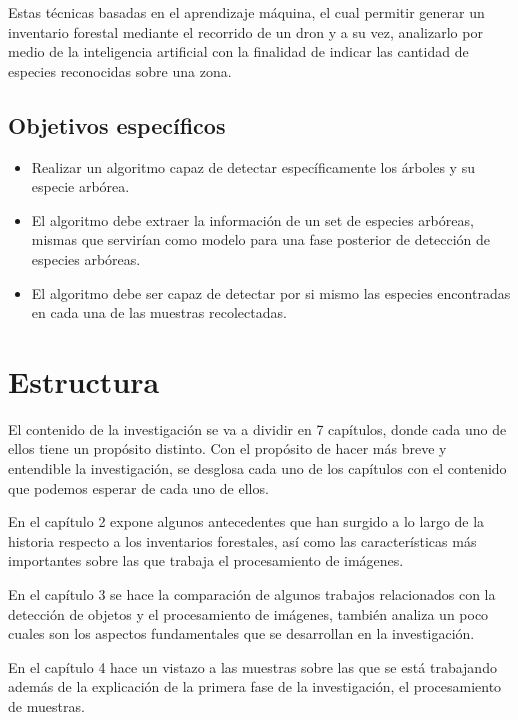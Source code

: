 Estas técnicas  basadas en el aprendizaje máquina, el cual permitir
generar un inventario forestal mediante el recorrido de un dron y a su vez, analizarlo por medio de la inteligencia artificial con la finalidad de indicar las cantidad de especies reconocidas sobre una zona.

\subsection{Objetivos específicos}
\begin{itemize}
\item Realizar un algoritmo capaz de detectar específicamente los árboles y su especie arbórea.
\end{itemize}

\begin{itemize}
\item El algoritmo debe extraer la información de un set de especies arbóreas, mismas que servirían como modelo para una fase posterior de detección de especies arbóreas.
\end{itemize}

\begin{itemize}
\item El algoritmo debe ser capaz de detectar por si mismo las especies encontradas en cada una de las muestras recolectadas.
\end{itemize}

\pagebreak

\section{Estructura}
El contenido de la investigación se va a dividir en 7 capítulos, donde cada uno de ellos tiene un propósito distinto. Con el propósito de hacer más breve y entendible la investigación, se desglosa cada uno de los capítulos con el contenido que podemos esperar de cada uno de ellos.

En el capítulo 2 expone algunos antecedentes que han surgido a lo largo
de la historia respecto a los inventarios forestales, así como las características más importantes sobre las que trabaja el procesamiento de imágenes.

En el capítulo 3 se hace la comparación de algunos trabajos relacionados con la detección de objetos y el procesamiento de imágenes, también analiza un poco cuales son los aspectos fundamentales que se desarrollan en la investigación.

En el capítulo 4 hace un vistazo a las muestras sobre las que se está trabajando además de la explicación de la primera fase de la investigación, el procesamiento de muestras.


